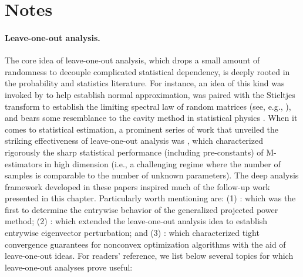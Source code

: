 \section{Notes}







\paragraph{Leave-one-out analysis.} The core idea of leave-one-out analysis,  which drops a small amount of randomness to decouple complicated statistical dependency, is deeply rooted in the probability and statistics literature. For instance, an idea of this kind was invoked by \citet{stein1972a} to help establish normal approximation,   was paired with the Stieltjes transform to establish the  limiting spectral law of random matrices (see, e.g., \citep[Section 2.4.3]{Tao2012RMT}), and bears some resemblance to the cavity method in statistical physics \citep{mezard2009information}.
When it comes to statistical estimation, a prominent series of work that unveiled the striking effectiveness of leave-one-out analysis was \citet{el2013robust,el2015impact}, which characterized rigorously the sharp statistical performance (including pre-constants) of M-estimators in high dimension (i.e., a challenging regime where the number of samples is comparable to the number of unknown parameters).
The deep analysis framework developed in these papers inspired much of the follow-up work presented in this chapter. Particularly worth mentioning are: (1) \citet{zhong2017near}: which was the first to determine the entrywise behavior of the generalized projected power method; (2) \citet{abbe2020entrywise,chen2017spectral}: which extended the leave-one-out analysis idea to establish entrywise eigenvector perturbation; and (3) \citet{ma2017implicit,chen2019gradient}: which characterized tight convergence guarantees for nonconvex optimization algorithms with the aid of leave-one-out ideas. For readers' reference, we list below several topics for which leave-one-out analyses prove useful:
%
